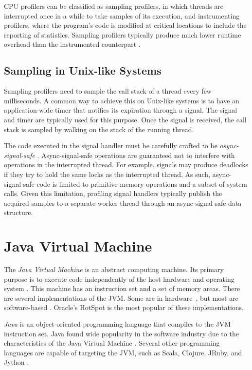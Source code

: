 CPU profilers can be classified as sampling profilers, in which threads are interrupted once in a while to take samples of its execution, and instrumenting profilers, where the program's code is modified at critical locations to include the reporting of statistics. Sampling profilers typically produce much lower runtime overhead than the instrumented counterpart \cite{moseley2007shadow}.

\subsection{Sampling in Unix-like Systems}

Sampling profilers need to sample the call stack of a thread every few milliseconds. A common way to achieve this on Unix-like systems is to have an application-wide timer that notifies its expiration through a signal. The  signal and  timer are typically used for this purpose. Once the signal is received, the call stack is sampled by walking on the stack of the running thread.

The code executed in the signal handler must be carefully crafted to be \emph{async-signal-safe} \cite{signalsafety}. Async-signal-safe operations are guaranteed not to interfere with operations in the interrupted thread. For example, signals may produce deadlocks if they try to hold the same locks as the interrupted thread. As such, async-signal-safe code is limited to primitive memory operations and a subset of system calls. Given this limitation, profiling signal handlers typically publish the acquired samples to a separate worker thread through an async-signal-safe data structure.


\section{Java Virtual Machine}

The \emph{Java Virtual Machine} is an abstract computing machine. Its primary purpose is to execute code independently of the host hardware and operating system \cite{jvmspec}. This machine has an instruction set and a set of memory areas. There are several implementations of the JVM. Some are in hardware~\cite{picojava}, but most are software-based \cite{hotspot, j9, zing}. Oracle's HotSpot is the most popular of these implementations.

\emph{Java} is an object-oriented programming language that compiles to the JVM instruction set. Java found wide popularity in the software industry due to the characteristics of the Java Virtual Machine \cite{kumar2017survey}. Several other programming languages are capable of targeting the JVM, such as Scala, Clojure, JRuby, and Jython \cite{li2013hosted}.

